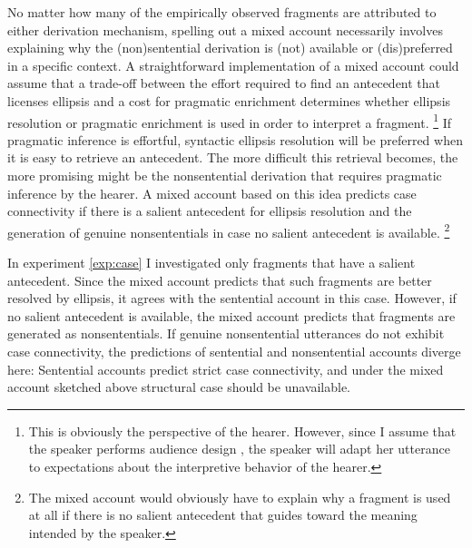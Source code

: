 No matter how many of the empirically observed fragments are attributed to either derivation mechanism, spelling out a mixed account necessarily involves explaining why the (non)sentential derivation is (not) available or (dis)\-preferred in a specific context. A straightforward implementation of a mixed account could assume that a trade-off between the effort required to find an antecedent that licenses ellipsis and a cost for pragmatic enrichment \citep{sperber.wilson1986, sperber.wilson1995,breheny.etal2006,  chevallier.etal2008} determines whether ellipsis resolution or pragmatic enrichment is used in order to interpret a fragment.%
%
\footnote{This is obviously the perspective of the hearer. However, since I assume that the speaker performs audience design \citep{bell1984}, the speaker will adapt her utterance to expectations about the interpretive behavior of the hearer.}\afterfn%
%
If pragmatic inference is effortful, syntactic ellipsis resolution will be preferred when it is easy to retrieve an antecedent. The more difficult this retrieval becomes, the more promising might be the nonsentential derivation that requires pragmatic inference by the hearer. A mixed account based on this idea predicts case connectivity if there is a salient antecedent for ellipsis resolution and the generation of genuine nonsententials in case no salient antecedent is available.\largerpage%
%
\footnote{The mixed account would obviously have to explain why a fragment is used at all if there is no salient antecedent that guides toward the meaning intended by the speaker.}\afterfn%
%

In experiment \ref{exp:case} I investigated only fragments that have a salient antecedent. Since the mixed account predicts that such fragments are better resolved by ellipsis, it agrees with the sentential account in this case. However, if no salient antecedent is available, the mixed account predicts that fragments are generated as nonsententials. If genuine nonsentential utterances do not exhibit case connectivity, the predictions of sentential and nonsentential accounts diverge here: Sentential accounts predict strict case connectivity, and under the mixed account sketched above structural case should be unavailable.

